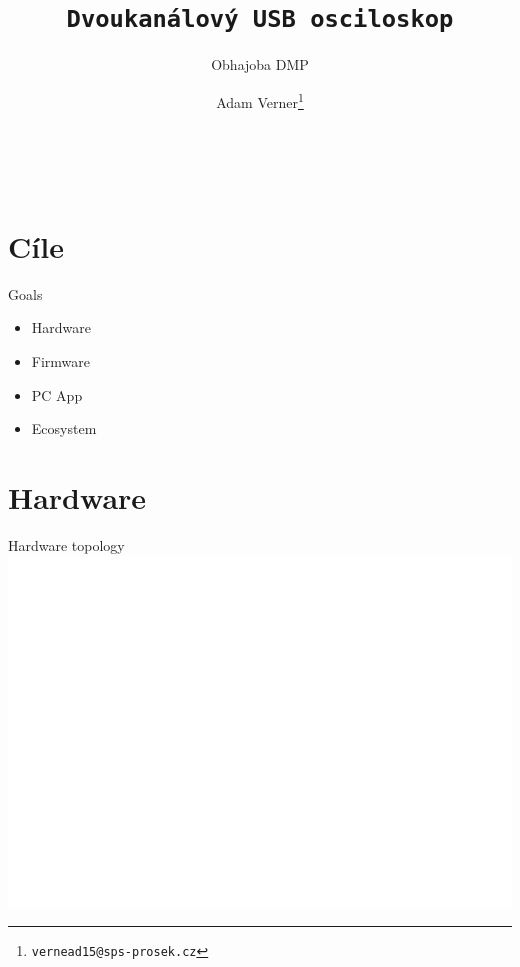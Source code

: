 \documentclass{beamer}
\title{\texttt{\LARGE Dvoukanálový USB osciloskop}}
\subtitle{ Obhajoba DMP }
\author{ Adam Verner\footnote{\texttt{vernead15@sps-prosek.cz}}}
\begin{document}
\begin{frame}
	\maketitle \\
\end{frame}
	
\section{Cíle}

	\begin{frame}{Goals}
		\begin{itemize}
			\item Hardware
			\item Firmware
			\item PC App
			\item Ecosystem
		\end{itemize}
	\end{frame}

\section{Hardware}


%	

	\begin{frame}{Hardware topology}
		\includegraphics[width=0.9\paperwidth]{Topology.png}
	\end{frame}
\end{document}

